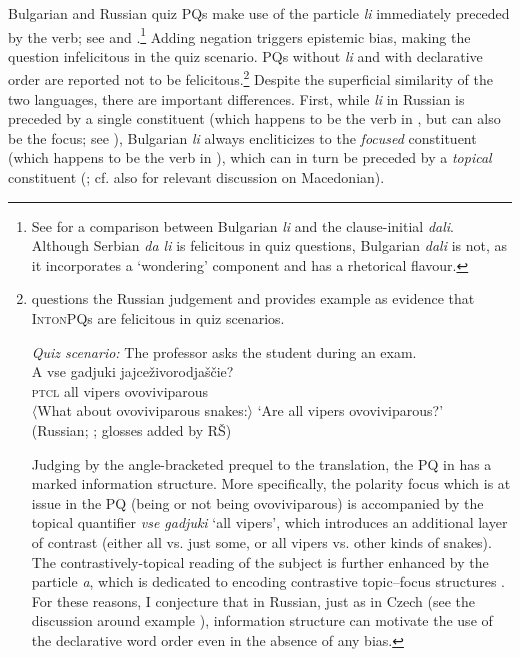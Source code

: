 \documentclass[output=paper,colorlinks,citecolor=brown]{langscibook}
\begin{document}
\noindent Bulgarian and Russian quiz PQs make use of the particle \textit{li} immediately preceded by the verb; see  and .\footnote{See \citet{Simeonova.Kamali2024} for a comparison between Bulgarian \textit{li} and the clause-initial \textit{dali}. Although Serbian \textit{da li} is felicitous in quiz questions, Bulgarian \textit{dali} is not, as it incorporates a `wondering' component and has a rhetorical flavour.} Adding negation triggers epistemic bias, making the question infelicitous in the quiz scenario. PQs without \textit{li} and with declarative order are reported not to be felicitous.\footnote{\citet{Zimmerling2023} questions the Russian judgement and provides example  as evidence that \textsc{IntonPQ}s are felicitous in quiz scenarios.

\ea \textit{Quiz scenario:} The professor asks the student during an exam.\label{sim:ex:zimmerl}\\
\gll A \minsp{$\nearrow$} vse gadjuki jajceživorodjaščie?\\
\textsc{ptcl} {} all vipers ovoviviparous\\
\glt $\langle$What about ovoviviparous snakes:$\rangle$ `Are all vipers ovoviviparous?'\\\hfill (Russian; \citealt[119]{Zimmerling2023}; glosses added by RŠ)
\z

\noindent Judging by the angle-bracketed prequel to the translation, the PQ in  has a marked information structure. More specifically, the polarity focus which is at issue in the PQ (being or not being ovoviviparous) is accompanied by the topical quantifier \textit{vse gadjuki} `all vipers', which introduces an additional layer of contrast (either all vs. just some, or all vipers vs. other kinds of snakes). The contrastively-topical reading of the subject is further enhanced by the particle \textit{a}, which is dedicated to encoding contrastive topic--focus structures \citep{Jasinskaja.Zeevat2008}. For these reasons, I conjecture that in Russian, just as in Czech (see the discussion around example ), information structure can motivate the use of the declarative word order even in the absence of any bias.} Despite the superficial similarity of the two languages, there are important differences. First, while \textit{li} in Russian is preceded by a single constituent (which happens to be the verb in , but can also be the focus; see \citealt{King1994,Franks.King2000}), Bulgarian \textit{li} always encliticizes to the \textit{focused} constituent (which happens to be the verb in ), which can in turn be preceded by a \textit{topical} constituent (\citealt{Izvorski.etal1997,Rudin.etal1997,Rudin.etal1999}; cf. also \citealt{Dukova-Zheleva2010,Jordanoska.Meertens2021} for relevant discussion on Macedonian).
\end{document}
